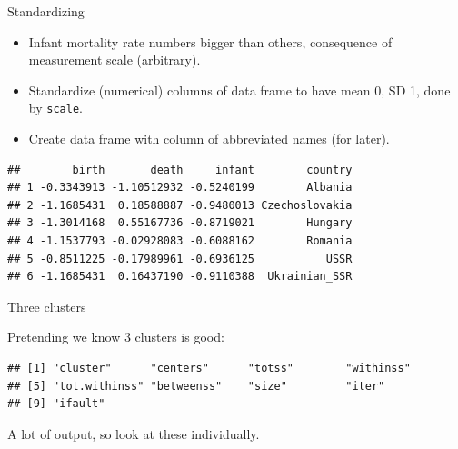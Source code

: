 \begin{frame}[fragile]{Standardizing}


\begin{itemize}
\item Infant mortality rate numbers bigger than others, consequence of
  measurement scale (arbitrary).
\item Standardize (numerical) columns of data frame to have mean 0, SD
  1, done by \texttt{scale}.
\item Create data frame with column of abbreviated names (for later).
  \end{itemize}

\begin{knitrout}\footnotesize
{}\color{fgcolor}\begin{kframe}
\begin{alltt}
\hlkwb{=}\hlstd{(}\hlstd{=}
                     \hlstd{=} \hlstd{=}
                      
\end{alltt}
\begin{verbatim}
##        birth       death     infant        country
## 1 -0.3343913 -1.10512932 -0.5240199        Albania
## 2 -1.1685431  0.18588887 -0.9480013 Czechoslovakia
## 3 -1.3014168  0.55167736 -0.8719021        Hungary
## 4 -1.1537793 -0.02928083 -0.6088162        Romania
## 5 -0.8511225 -0.17989961 -0.6936125           USSR
## 6 -1.1685431  0.16437190 -0.9110388  Ukrainian_SSR
\end{verbatim}
\end{kframe}
\end{knitrout}
  
\end{frame}

\begin{frame}[fragile]{Three clusters}
  
  Pretending we know 3 clusters is good:



{\small
\begin{knitrout}
\color{fgcolor}\begin{kframe}
\begin{alltt}
\hlkwb{=}\hlstd{(vital.s[,}\hlopt{:}\hlstd{],}\hlstd{)}
\end{alltt}
\begin{verbatim}
## [1] "cluster"      "centers"      "totss"        "withinss"    
## [5] "tot.withinss" "betweenss"    "size"         "iter"        
## [9] "ifault"
\end{verbatim}
\end{kframe}
\end{knitrout}
  }
  
  A lot of output, so look at these individually.
  
\end{frame}


